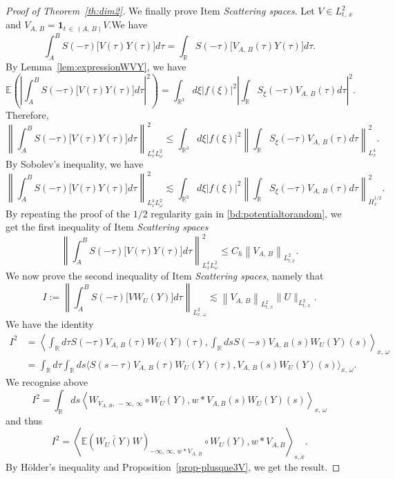 \documentclass[10pt]{amsart}
\theoremstyle{definition}\newtheorem{defi}[theo]{Definition}\newtheorem{rema}[theo]{Remark}\newtheorem{exam}[theo]{Example}\newtheorem{exem}[theo]{Example}\newtheorem{nota}[theo]{Notation}
\newcommand{\R}{\mathbb{R}}
\newcommand{\E}{\mathbb{E}}
\newcommand{\bfun}{\mathbf{1}}
\begin{document}
\begin{proof}[Proof of Theorem~\ref{th:dim2}]
We finally prove Item \emph{Scattering spaces}. Let $V \in L^2_{t,\,x}$ and $V_{A,\,B} = \bfun_{t\,\in\,(A,\,B)} V$.\linebreak We have
\[
\int_{A}^B S(-\tau) \big[V(\tau) Y(\tau)\big] d\tau = \int_{\R} S(-\tau) \big[V_{A,\,B}(\tau) Y(\tau)\big] d\tau.
\]
By Lemma~\ref{lem:expressionWVY}, we have
\[
\E \left(\left|\int_{A}^B S(-\tau) \big[V(\tau) Y(\tau)\big] d\tau\right|^2\right) = \int_{\R^3} d\xi |f(\xi)|^2 \left|\int_{\R} S_\xi(-\tau) V_{A,\,B}(\tau)d\tau \right|^2.
\]
Therefore,
\[
\left\| \int_{A}^B S(-\tau) \big[V(\tau) Y(\tau)\big] d\tau\right\|_{L^4_x L^2_\omega}^2 \leq \int_{\R^3} d\xi |f(\xi)|^2 \left\| \int_{\R} S_\xi(-\tau) V_{A,\,B}(\tau)d\tau\right\|_{L^4_x}^2.
\]
By Sobolev's inequality, we have
\[
\left\| \int_{A}^B S(-\tau) \big[V(\tau) Y(\tau)\big] d\tau\right\|_{L^4_x L^2_\omega}^2 \lesssim \int_{\R^3} d\xi |f(\xi)|^2 \left\| \int_{\R} S_\xi(-\tau) V_{A,\,B}(\tau)d\tau\right\|_{\dot H^{1/2}_x}^2.
\]
By repeating the proof of the $1/2$ regularity gain in \eqref{bd:potentialtorandom}, we get the first inequality of Item \emph{Scattering spaces}
\[
\left\| \int_{A}^B S(-\tau) \big[V(\tau) Y(\tau)\big] d\tau\right\|_{L^4_x L^2_\omega}^2 \leq C_h \left\|V_{A,\,B}\right\|_{L^2_{t,x}}.
\]
We now prove the second inequality of Item \emph{Scattering spaces}, namely that
\[
I := \left\|\int_{A}^B S(-\tau) \big[V W_U(Y)\big] d\tau \right\|_{L^2_{x,\,\omega}} \lesssim \left\|V_{A,\,B}\right\|_{L^2_{t,\,x}} \|U\|_{L^2_{t,\,x}}.
\]
We have the identity
\begin{align*} 
I^2 &=\left\langle\int_{\R} d\tau S(-\tau) V_{A,\,B} (\tau) W_U(Y)(\tau), \int_{\R} ds S(-s)V_{A,\,B}(s) W_U(Y)(s)\right\rangle_{x,\,\omega}\\
& = \int_{\R} d\tau \int_{\R} ds \big\langle S(s-\tau) V_{A,\,B}(\tau)W_U(Y) (\tau), V_{A,\,B}(s) W_U(Y)(s)\big\rangle_{x,\,\omega}.
\end{align*}
We recognise above
\[
I^2 = \int_{\R} ds \left\langle W_{V_{A,\,B},\,-\infty,\,\infty} \circ W_U(Y), w*V_{A,B}(s) W_U(Y)(s)\right\rangle_{x,\,\omega}
\]
and thus
\[
I^2 = \left\langle\E\left(\overline{W_U(Y)}W\right)_{-\infty,\,\infty,\,w*V_{A,\,B}} \circ W_U(Y), w*V_{A,B}\right\rangle_{s,x}.
\]
By H\"older's inequality and Proposition~\ref{prop-plusque3V}, we get the result.
\end{proof}
\end{document}
